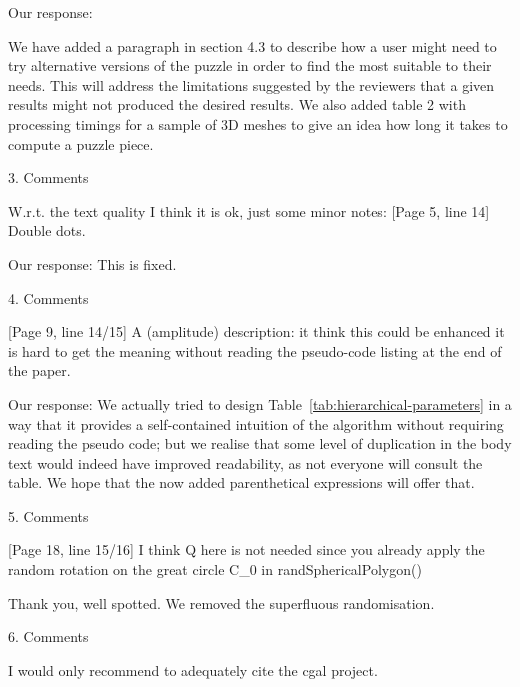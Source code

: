 \documentclass[acmlarge,screen,dvipsnames]{acmart}
\begin{document}
\greenBegin

Our response:

We have added a paragraph in section 4.3 to describe how a user might need to try alternative versions of the puzzle in order to find the most suitable to their needs. This will address the limitations suggested by the reviewers that a given results might not produced the desired results. We also added table 2 with processing timings for a sample of 3D meshes to give an idea how long it takes to compute a puzzle piece.


\greenEnd


3. Comments

W.r.t. the text quality I think it is ok, just some minor notes:
[Page 5,  line 14] Double dots.

\greenBegin

Our response: This is fixed.

\greenEnd


4. Comments


[Page 9,  line 14/15] A (amplitude) description: it think this could be enhanced it is hard to get the meaning without reading the pseudo-code listing at the end of the paper. 

\greenBegin

Our response: We actually tried to design
Table~\ref{tab:hierarchical-parameters} in a way that it provides a
self-contained intuition of the algorithm without requiring reading
the pseudo code; but we realise that some level of duplication in the
body text would indeed have improved readability, as not everyone will
consult the table. We hope that the now added parenthetical
expressions will offer that.

\greenEnd

5. Comments

[Page 18, line 15/16] I think Q here is not needed since you already apply the random rotation on the great circle C\_0 in randSphericalPolygon() 

\greenBegin

Thank you, well spotted. We removed the superfluous randomisation.

\greenEnd


6. Comments

I would only recommend to adequately cite the cgal project. 

\greenBegin
\end{document}
